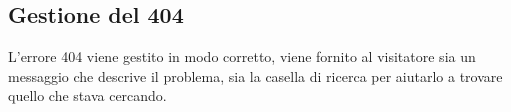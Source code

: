 \FloatBarrier

\subsection{Gestione del 404}%
L'errore 404 viene gestito in modo corretto, viene fornito al visitatore sia un messaggio che descrive il problema, sia la casella di ricerca per aiutarlo a trovare quello che stava cercando.